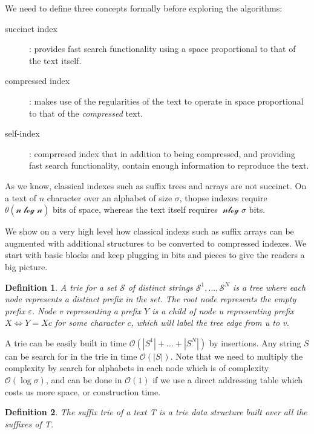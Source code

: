 \documentclass[11pt]{article}
\newtheorem{mydef}{Definition}
\begin{document}
We need to define three concepts formally before exploring the algorithms:
\begin{description}
\item [succinct index]: provides fast search functionality using a space proportional to that of the text itself.
\item [compressed index]: makes use of the regularities of the text to operate in space proportional to that of the \emph{compressed} text.  
\item [self-index]: comprresed index that in addition to being compressed, and providing fast search functionality, contain enough information to reproduce the text.
\end{description}

As we know, classical indexes such as suffix trees and arrays are not succinct. On a text of $n$ character over an alphabet of size $\sigma$, thopse indexes require $\mathcal{\theta(\text{n}\log \text{n})}$ bits of space, whereas the text itself requires $\mathcal{\text{n}\log} \sigma$ bits.

We show on a very high level how classical indexs such as suffix arrays can be augmented with additional structures to be converted to compressed indexes. We start with basic blocks and keep plugging in bits and pieces to give the readers a big picture.

\begin{mydef}
A trie for a set $\mathcal{S}$ of distinct strings $\mathcal{S}^1, ..., \mathcal{S}^N$ is a tree where each node represents a distinct prefix in the set. The root node represents the empty prefix $\varepsilon$. Node \emph{v} representing a prefix $Y$ is a child of node \emph{u} representing prefix $X \iff Y=Xc$ for some character $c$, which will label the tree edge from \emph{u} to \emph{v}. 
\end{mydef}

A trie can be easily built in time $\mathcal{O}(|S^1|+...+|S^N|)$ by insertions. Any string $S$ can be search for in the trie in time $\mathcal{O}(|S|)$. Note that we need to multiply the complexity by search for alphabets in each node which is of complexity $\mathcal{O}(\log\sigma)$, and can be done in $\mathcal{O}(1)$ if we use a direct addressing table which costs us more space, or construction time.

\begin{mydef}
The suffix trie of a text T is a trie data structure built over all the suffixes of T.
\end{mydef} 
\end{document}
